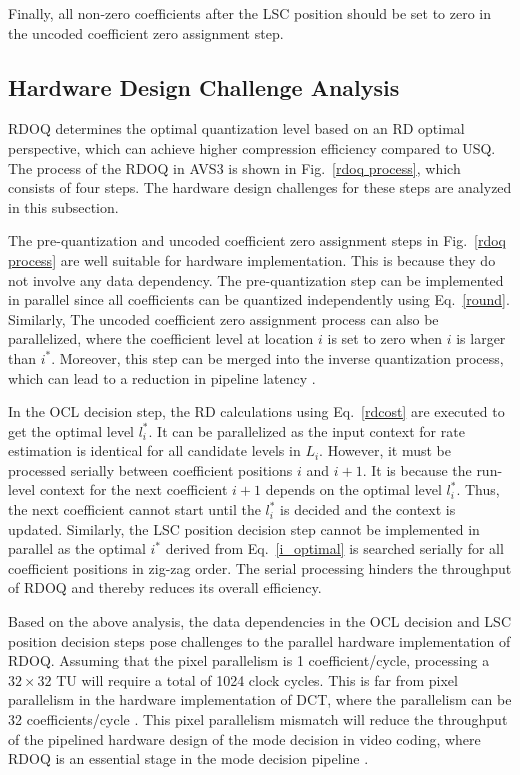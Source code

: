 \documentclass[lettersize,journal]{IEEEtran}
\begin{document}
Finally, all non-zero coefficients after the LSC position should be set to zero in the uncoded coefficient zero assignment step. 

\subsection{Hardware Design Challenge Analysis}
\label{subsec:B}
RDOQ determines the optimal quantization level based on an RD optimal perspective, which can achieve higher compression efficiency compared to USQ. The process of the RDOQ in AVS3 is shown in Fig.~\ref{rdoq process}, which consists of four steps. The hardware design challenges for these steps are analyzed in this subsection. 

The pre-quantization and uncoded coefficient zero assignment steps in Fig.~\ref{rdoq process} are well suitable for hardware implementation. This is because they do not involve any data dependency. The pre-quantization step can be implemented in parallel since all coefficients can be quantized independently using Eq.~\eqref{round}. Similarly, The uncoded coefficient zero assignment process can also be parallelized, where the coefficient level at location $i$ is set to zero when $i$ is larger than $i_{}^{*}$. Moreover, this step can be merged into the inverse quantization process, which can lead to a reduction in pipeline latency \cite{braatz2018high}. 

In the OCL decision step, the RD calculations using Eq.~\eqref{rdcost} are executed to get the optimal level $l_{i}^{*}$. It can be parallelized as the input context for rate estimation is identical for all candidate levels in $L_{i}$. However, it must be processed serially between coefficient positions $i$ and $i+1$. It is because the run-level context for the next coefficient $i+1$ depends on the optimal level $l_{i}^{*}$. Thus, the next coefficient cannot start until the $l_{i}^{*}$ is decided and the context is updated. Similarly, the LSC position decision step cannot be implemented in parallel as the optimal $i_{}^{*}$ derived from Eq.~\eqref{i_optimal} is searched serially for all coefficient positions in zig-zag order. The serial processing hinders the throughput of RDOQ and thereby reduces its overall efficiency. 

Based on the above analysis, the data dependencies in the OCL decision and LSC position decision steps pose challenges to the parallel hardware implementation of RDOQ. Assuming that the pixel parallelism is 1 coefficient/cycle, processing a $32\times32$ TU will require a total of 1024 clock cycles. This is far from pixel parallelism in the hardware implementation of DCT, where the parallelism can be 32 coefficients/cycle \cite{meher2013efficient,fan2019pipelined,Hao2023Multiple}. This pixel parallelism mismatch will reduce the throughput of the pipelined hardware design of the mode decision in video coding, where RDOQ is an essential stage in the mode decision pipeline \cite{sun2017fast,zhang2018efficient,huang2018three,zhang2018highly}.
\end{document}
